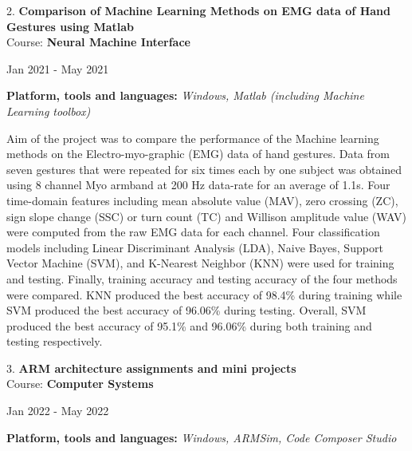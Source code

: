 \documentclass[10pt]{article}
\newenvironment{innerlist}[1][\enskip\textbullet]%
        {\begin{compactitem}[#1]}{\end{compactitem}}
\newenvironment{loneinnerlist}[1][\enskip\textbullet]%
        {\vspace{-\baselineskip}\begin{compactitem}[#1]}
        {\end{compactitem}\vspace{-.6\baselineskip}}
\begin{document}
\begin{loneinnerlist}
\item[2.]\textbf{Comparison of Machine Learning Methods on EMG data of Hand Gestures using Matlab} \\ 
\vspace{4pt}
Course: \textbf{Neural Machine Interface} \\
\vspace*{-28pt} \begin{flushright} Jan 2021 - May 2021 \end{flushright}
\textbf{Platform, tools and languages:} \emph{Windows, Matlab (including Machine Learning toolbox)} 
\vspace*{2pt}
\begin{innerlist} \item Aim of the project was to compare the performance of the Machine learning methods on the Electro-myo-graphic (EMG) data of hand gestures. Data from seven gestures that were repeated for six times each by one subject was obtained using 8 channel Myo armband at 200 Hz data-rate for an average of 1.1s. Four time-domain features including mean absolute value (MAV), zero crossing (ZC), sign slope change (SSC) or turn count (TC) and Willison amplitude value (WAV) were computed from the raw EMG data for each channel. Four classification models including Linear Discriminant Analysis (LDA), Naive Bayes, Support Vector Machine (SVM), and K-Nearest Neighbor (KNN) were used for training and testing. Finally, training accuracy  and testing accuracy of the four methods were compared. KNN produced the best accuracy of 98.4\% during training while SVM produced the best accuracy of 96.06\% during testing. Overall, SVM produced the best accuracy of 95.1\% and 96.06\% during both training and testing respectively.
\end{innerlist}  \vspace*{6pt}

\item[3.]\textbf{ ARM architecture assignments and mini projects} \\ 
\vspace{4pt}
Course: \textbf{Computer Systems} \\
\vspace*{-28pt} \begin{flushright} Jan 2022 - May 2022 \end{flushright}
\textbf{Platform, tools and languages:} \emph{Windows, ARMSim, Code Composer Studio} 


\end{loneinnerlist}
\end{document}
